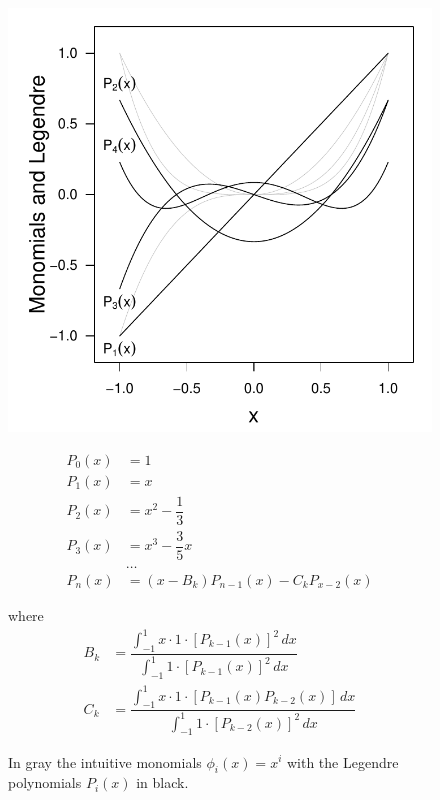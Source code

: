 \documentclass[11pt]{article}
\begin{document}
\begin{figure}[ht!]\centering

\begin{minipage}[c]{0.48\textwidth}
\includegraphics[width=\textwidth]{3_approximation/legendre_funs.pdf}

\end{minipage}
\begin{minipage}[c]{0.48\textwidth}
\begin{align*}
P_0(x) & = 1\\
P_1(x) & = x\\
P_2(x) & = x^2-\dfrac{1}{3}\\
P_3(x) & = x^3-\dfrac{3}{5}x\\
 & \dots\\
P_n(x) & = (x-B_k)P_{n-1}(x)-C_kP_{x-2}(x)
\end{align*}

where
\begin{align*}
B_k & = \dfrac{\int_{-1}^1 x \cdot 1 \cdot [P_{k-1}(x)]^2\,dx}{\int_{-1}^1 1 \cdot [P_{k-1}(x)]^2\,dx}\\
C_k & = \dfrac{\int_{-1}^1 x \cdot 1 \cdot [P_{k-1}(x) P_{k-2}(x)]\,dx}{\int_{-1}^1 1 \cdot [P_{k-2}(x)]^2\,dx}
\end{align*}

\caption{In gray the intuitive monomials \(\phi_i(x) = x^i\) with the Legendre polynomials \(P_i(x)\) in black.}\label{fig::leg}

\end{minipage}
\end{figure}
\end{document}
